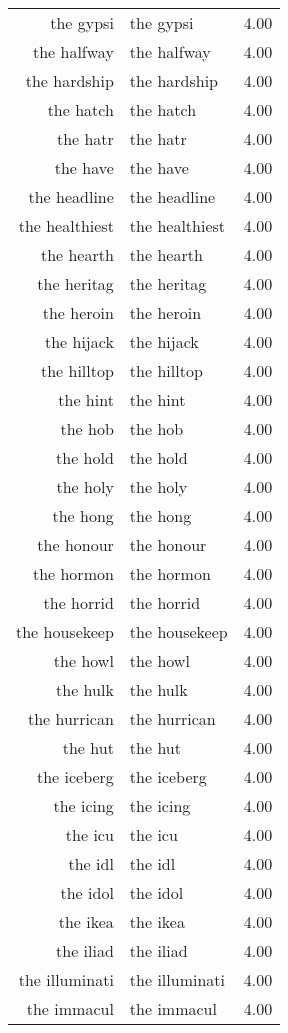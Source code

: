 \begin{table}[ht]
\begin{tabular}{rlr}
  the gypsi & the gypsi & 4.00 \\ 
  the halfway & the halfway & 4.00 \\ 
  the hardship & the hardship & 4.00 \\ 
  the hatch & the hatch & 4.00 \\ 
  the hatr & the hatr & 4.00 \\ 
  the have & the have & 4.00 \\ 
  the headline & the headline & 4.00 \\ 
  the healthiest & the healthiest & 4.00 \\ 
  the hearth & the hearth & 4.00 \\ 
  the heritag & the heritag & 4.00 \\ 
  the heroin & the heroin & 4.00 \\ 
  the hijack & the hijack & 4.00 \\ 
  the hilltop & the hilltop & 4.00 \\ 
  the hint & the hint & 4.00 \\ 
  the hob & the hob & 4.00 \\ 
  the hold & the hold & 4.00 \\ 
  the holy & the holy & 4.00 \\ 
  the hong & the hong & 4.00 \\ 
  the honour & the honour & 4.00 \\ 
  the hormon & the hormon & 4.00 \\ 
  the horrid & the horrid & 4.00 \\ 
  the housekeep & the housekeep & 4.00 \\ 
  the howl & the howl & 4.00 \\ 
  the hulk & the hulk & 4.00 \\ 
  the hurrican & the hurrican & 4.00 \\ 
  the hut & the hut & 4.00 \\ 
  the iceberg & the iceberg & 4.00 \\ 
  the icing & the icing & 4.00 \\ 
  the icu & the icu & 4.00 \\ 
  the idl & the idl & 4.00 \\ 
  the idol & the idol & 4.00 \\ 
  the ikea & the ikea & 4.00 \\ 
  the iliad & the iliad & 4.00 \\ 
  the illuminati & the illuminati & 4.00 \\ 
  the immacul & the immacul & 4.00 \\ 

\end{tabular}
\end{table}
